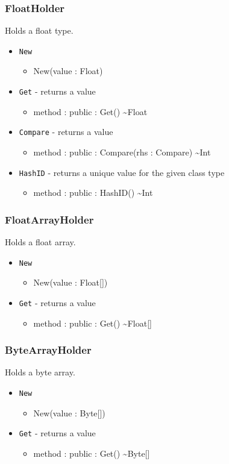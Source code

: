 \documentclass[11pt]{article}
\begin{document}
\subsubsection{FloatHolder}
Holds a float type.
\begin{itemize}
\item \texttt{New}
  \begin{itemize}
  \item New(value : Float)
  \end{itemize}
\item \texttt{Get} - returns a value
  \begin{itemize}
  \item method : public : Get() \textasciitilde Float
  \end{itemize}
\item \texttt{Compare} - returns a value
  \begin{itemize}
  \item method : public : Compare(rhs : Compare) \textasciitilde Int
  \end{itemize}
\item \texttt{HashID} - returns a unique value for the given class
  type
  \begin{itemize}
  \item method : public : HashID() \textasciitilde Int
  \end{itemize}
\end{itemize}

\subsubsection{FloatArrayHolder}
Holds a float array.
\begin{itemize}
\item \texttt{New}
  \begin{itemize}
  \item New(value : Float[])
  \end{itemize}
\item \texttt{Get} - returns a value
  \begin{itemize}
  \item method : public : Get() \textasciitilde Float[]
  \end{itemize}
\end{itemize}

\subsubsection{ByteArrayHolder}
Holds a byte array.
\begin{itemize}
\item \texttt{New}
  \begin{itemize}
  \item New(value : Byte[])
  \end{itemize}
\item \texttt{Get} - returns a value
  \begin{itemize}
  \item method : public : Get() \textasciitilde Byte[]
  \end{itemize}
\end{itemize}
\end{document}
